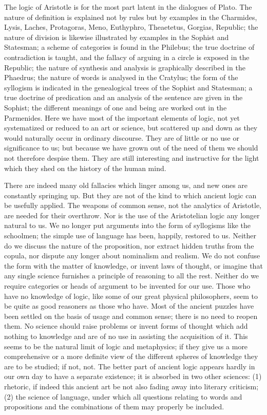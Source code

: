 \documentclass[11pt,letter]{article}
\begin{document}
\par  The logic of Aristotle is for the most part latent in the dialogues of Plato. The nature of definition is explained not by rules but by examples in the Charmides, Lysis, Laches, Protagoras, Meno, Euthyphro, Theaetetus, Gorgias, Republic; the nature of division is likewise illustrated by examples in the Sophist and Statesman; a scheme of categories is found in the Philebus; the true doctrine of contradiction is taught, and the fallacy of arguing in a circle is exposed in the Republic; the nature of synthesis and analysis is graphically described in the Phaedrus; the nature of words is analysed in the Cratylus; the form of the syllogism is indicated in the genealogical trees of the Sophist and Statesman; a true doctrine of predication and an analysis of the sentence are given in the Sophist; the different meanings of one and being are worked out in the Parmenides. Here we have most of the important elements of logic, not yet systematized or reduced to an art or science, but scattered up and down as they would naturally occur in ordinary discourse. They are of little or no use or significance to us; but because we have grown out of the need of them we should not therefore despise them. They are still interesting and instructive for the light which they shed on the history of the human mind.

\par  There are indeed many old fallacies which linger among us, and new ones are constantly springing up. But they are not of the kind to which ancient logic can be usefully applied. The weapons of common sense, not the analytics of Aristotle, are needed for their overthrow. Nor is the use of the Aristotelian logic any longer natural to us. We no longer put arguments into the form of syllogisms like the schoolmen; the simple use of language has been, happily, restored to us. Neither do we discuss the nature of the proposition, nor extract hidden truths from the copula, nor dispute any longer about nominalism and realism. We do not confuse the form with the matter of knowledge, or invent laws of thought, or imagine that any single science furnishes a principle of reasoning to all the rest. Neither do we require categories or heads of argument to be invented for our use. Those who have no knowledge of logic, like some of our great physical philosophers, seem to be quite as good reasoners as those who have. Most of the ancient puzzles have been settled on the basis of usage and common sense; there is no need to reopen them. No science should raise problems or invent forms of thought which add nothing to knowledge and are of no use in assisting the acquisition of it. This seems to be the natural limit of logic and metaphysics; if they give us a more comprehensive or a more definite view of the different spheres of knowledge they are to be studied; if not, not. The better part of ancient logic appears hardly in our own day to have a separate existence; it is absorbed in two other sciences: (1) rhetoric, if indeed this ancient art be not also fading away into literary criticism; (2) the science of language, under which all questions relating to words and propositions and the combinations of them may properly be included.
\end{document}
